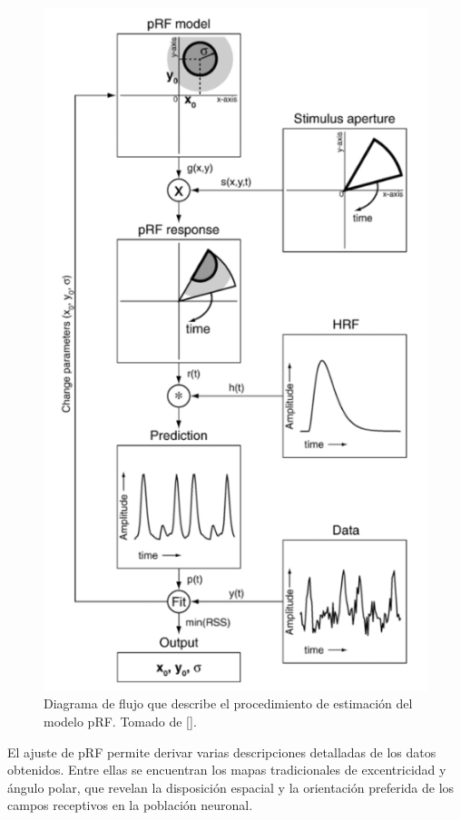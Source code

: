 \begin{figure}
	\centering
	\includegraphics[scale=0.75]{../images/pRF model}
	\caption{Diagrama de flujo que describe el procedimiento de estimación del modelo pRF. Tomado de [\cite{dumoulin_population_2008}].}
	\label{fig:pRF}
\end{figure}

El ajuste de pRF permite derivar varias descripciones detalladas de los datos obtenidos. Entre ellas se encuentran los mapas tradicionales de excentricidad y ángulo polar, que revelan la disposición espacial y la orientación preferida de los campos receptivos en la población neuronal.


